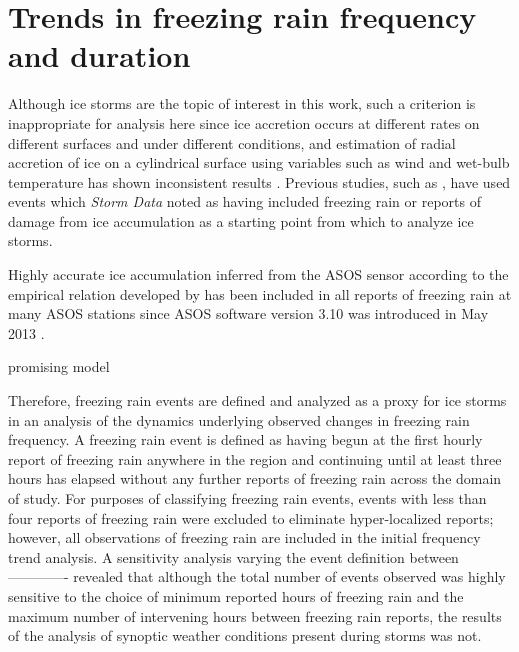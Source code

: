 \documentclass[twocol]{ametsoc}
\begin{document}
\section{Trends in freezing rain frequency and duration}
Although ice storms are the topic of interest in this work, such a criterion is inappropriate for analysis here since ice accretion occurs at different rates on different surfaces and under different conditions, and estimation of radial accretion of ice on a cylindrical surface using variables such as wind and wet-bulb temperature has shown inconsistent results \citep{add a citation for this}. Previous studies, such as \citet{swaminathan2015modeling}, have used events which \textit{Storm Data} noted as having included freezing rain or reports of damage from ice accumulation as a starting point from which to analyze ice storms. 

Highly accurate ice accumulation inferred from the ASOS sensor according to the empirical relation developed by \cite{ryerson2007quantitative} has been included in all reports of freezing rain at many ASOS stations since ASOS software version 3.10 was introduced in May 2013 \citep{nws2013}.

\citet{sanders2016analysis} promising model

Therefore, freezing rain events are defined and analyzed as a proxy for ice storms in an analysis of the dynamics underlying observed changes in freezing rain frequency. A freezing rain event is defined as having begun at the first hourly report of freezing rain anywhere in the region and continuing until at least three hours has elapsed without any further reports of freezing rain across the domain of study. For purposes of classifying freezing rain events, events with less than four reports of freezing rain were excluded to eliminate hyper-localized reports; however, all observations of freezing rain are included in the initial frequency trend analysis. A sensitivity analysis varying the event definition between ------------- revealed that although the total number of events observed was highly sensitive to the choice of minimum reported hours of freezing rain and the maximum number of intervening hours between freezing rain reports, the results of the analysis of synoptic weather conditions present during storms was not.
\end{document}
